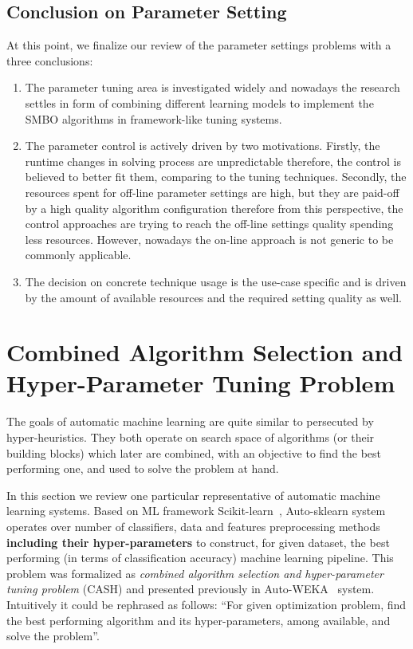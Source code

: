 \subsection{Conclusion on Parameter Setting}\label{bg: parameter setting conclution}
At this point, we finalize our review of the parameter settings problems with a three conclusions:
\begin{enumerate}
	\item The parameter tuning area is investigated widely and nowadays the research settles in form of combining different learning models to implement the SMBO algorithms in framework-like tuning systems.
	
	\item The parameter control is actively driven by two motivations. Firstly, the runtime changes in solving process are unpredictable therefore, the control is believed to better fit them, comparing to the tuning techniques. Secondly, the resources spent for off-line parameter settings are high, but they are paid-off by a high quality algorithm configuration therefore from this perspective, the control approaches are trying to reach the off-line settings quality spending less resources. However, nowadays the on-line approach is not generic to be commonly applicable.
	
	\item The decision on concrete technique usage is the use-case specific and is driven by the amount of available resources and the required setting quality as well.
\end{enumerate}

\section{Combined Algorithm Selection and Hyper-Parameter Tuning Problem}\label{bg: section cash}
The goals of automatic machine learning are quite similar to persecuted by hyper-heuristics. They both operate on search space of algorithms (or their building blocks) which later are combined, with an objective to find the best performing one, and used to solve the problem at hand. 

In this section we review one particular representative of automatic machine learning systems.
Based on ML framework Scikit-learn~\cite{scikit-learn}, Auto-sklearn system~\cite{feurer2015efficient} operates over number of classifiers, data and features preprocessing methods \textbf{including their hyper-parameters} to construct, for given dataset, the best performing (in terms of classification accuracy) machine learning pipeline.
This problem was formalized as \textit{combined algorithm selection and hyper-parameter tuning problem} (CASH) and presented previously in Auto-WEKA~\cite{thornton2013auto} system. Intuitively it could be rephrased as follows: ``For given optimization problem, find the best performing algorithm and its hyper-parameters, among available, and solve the problem''. 

